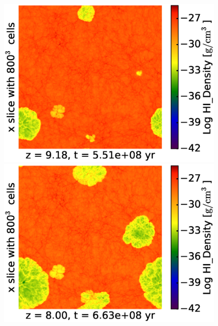 \begin{figure}[!tp]
    \begin{minipage}[h]{0.5\linewidth}
        \centering
        \includegraphics[trim = 15mm 5mm 0mm 15mm, clip, width=1.0\textwidth]{1_1_slice_HI_Density_x_HD4050.eps}
    \end{minipage}
\hspace*{-4.00mm}
    \begin{minipage}[h]{0.5\linewidth}
        \centering
        \includegraphics[trim = 15mm 5mm 0mm 15mm, clip, width=1.0\textwidth]{1_2_slice_HI_Density_x_HD6150.eps}
    \end{minipage}
\\
    \begin{minipage}[h]{0.5\linewidth}

\end{minipage}
\end{figure}
